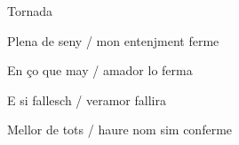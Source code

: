\documentclass[12pt]{article}
\begin{document}
\begin{estrofaExtra}%




\begin{tornada}

Tornada

\end{tornada}


\end{estrofaExtra}


\begin{estrofa}

 Plena de seny / mon entenjment ferme

 En \c{c}o que may / amador lo ferma

 E si fallesch / veramor fallira

 Mellor de tots / haure nom sim conferme

\end{estrofa}
\end{document}
